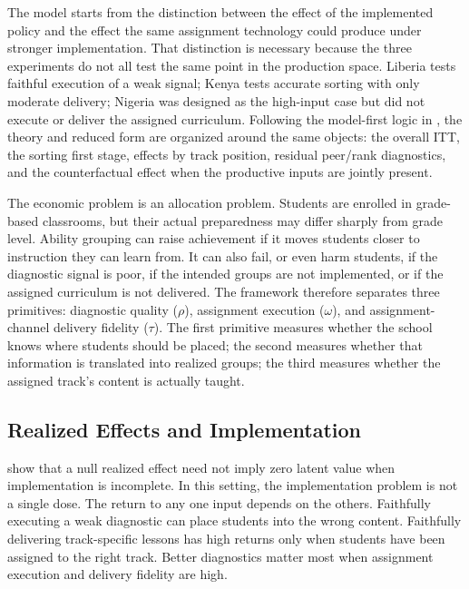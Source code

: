 \documentclass[11pt]{article}
\begin{document}
The model starts from the distinction between the effect of the implemented policy and the effect the same assignment technology could produce under stronger implementation. That distinction is necessary because the three experiments do not all test the same point in the production space. Liberia tests faithful execution of a weak signal; Kenya tests accurate sorting with only moderate delivery; Nigeria was designed as the high-input case but did not execute or deliver the assigned curriculum. Following the model-first logic in \citet{duflo2011peer}, the theory and reduced form are organized around the same objects: the overall ITT, the sorting first stage, effects by track position, residual peer/rank diagnostics, and the counterfactual effect when the productive inputs are jointly present.

The economic problem is an allocation problem. Students are enrolled in grade-based classrooms, but their actual preparedness may differ sharply from grade level. Ability grouping can raise achievement if it moves students closer to instruction they can learn from. It can also fail, or even harm students, if the diagnostic signal is poor, if the intended groups are not implemented, or if the assigned curriculum is not delivered. The framework therefore separates three primitives: diagnostic quality ($\rho$), assignment execution ($\omega$), and assignment-channel delivery fidelity ($\tau$). The first primitive measures whether the school knows where students should be placed; the second measures whether that information is translated into realized groups; the third measures whether the assigned track's content is actually taught.

\subsection{Realized Effects and Implementation}

\citet{angristmeager2023} show that a null realized effect need not imply zero latent value when implementation is incomplete. In this setting, the implementation problem is not a single dose. The return to any one input depends on the others. Faithfully executing a weak diagnostic can place students into the wrong content. Faithfully delivering track-specific lessons has high returns only when students have been assigned to the right track. Better diagnostics matter most when assignment execution and delivery fidelity are high.
\end{document}
